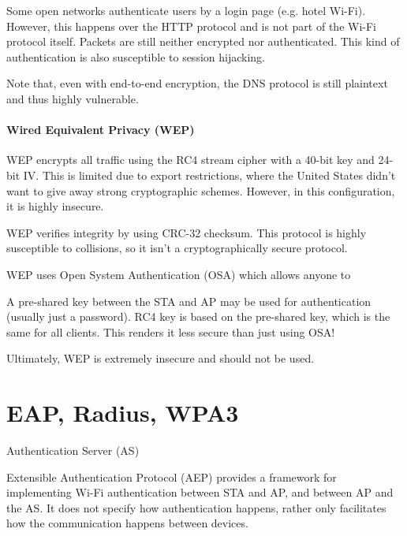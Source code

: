 Some open networks authenticate users by a login page (e.g. hotel Wi-Fi). However, this happens over the HTTP protocol and is not part of the Wi-Fi protocol itself. Packets are still neither encrypted nor authenticated. This kind of authentication is also susceptible to session hijacking.

Note that, even with end-to-end encryption, the DNS protocol is still plaintext and thus highly vulnerable.

\paragraph{Wired Equivalent Privacy (WEP)} WEP encrypts all traffic using the RC4 stream cipher with a 40-bit key and 24-bit IV. This is limited due to export restrictions, where the United States didn't want to give away strong cryptographic schemes. However, in this configuration, it is highly insecure.

WEP verifies integrity by using CRC-32 checksum. This protocol is highly susceptible to collisions, so it isn't a cryptographically secure protocol.

WEP uses Open System Authentication (OSA) which allows anyone to 

A pre-shared key between the STA and AP may be used for authentication (usually just a password). RC4 key is based on the pre-shared key, which is the same for all clients. This renders it less secure than just using OSA!

\begin{notebox}
    Ultimately, WEP is extremely insecure and should not be used.
\end{notebox}

\section{EAP, Radius, WPA3}

\begin{dfnbox}{Authentication Server (AS)}{}

\end{dfnbox}

\begin{dfnbox}{Extensible Authentication Protocol (AEP)}{}
     provides a framework for implementing Wi-Fi authentication between STA and AP, and between AP and the AS. It does not specify how authentication happens, rather only facilitates how the communication happens between devices.
\end{dfnbox}

